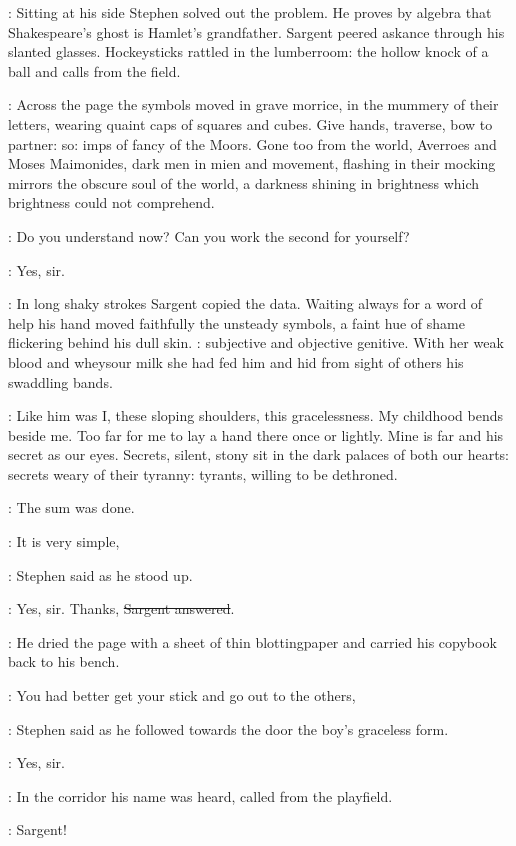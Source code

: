 :
Sitting at his side Stephen solved out the problem.
He proves by algebra that Shakespeare's ghost is Hamlet's grandfather.
Sargent peered askance through his slanted glasses.
Hockeysticks rattled in the lumberroom:
the hollow knock of a ball and calls from the field.

\StephenInt:
Across the page the symbols moved in grave morrice,
in the mummery of their letters,
wearing quaint caps of squares and cubes.
Give hands, traverse, bow to partner:
so:
imps of fancy of the Moors.
Gone too from the world,
Averroes and Moses Maimonides,
dark men in mien and movement,
flashing in their mocking mirrors the obscure soul of the world,
a darkness shining in brightness which brightness could not comprehend.

\Stephen:
Do you understand now?
Can you work the second for yourself?

\sargent:
Yes, sir.

:
In long shaky strokes Sargent copied the data.
Waiting always for a word of help
his hand moved faithfully the unsteady symbols,
a faint hue of shame flickering behind his dull skin.
: subjective and objective genitive.
With her weak blood and wheysour milk
she had fed him and hid from sight of others his swaddling bands.

\StephenInt:
Like him was I, these sloping shoulders, this gracelessness.
My childhood bends beside me.
Too far for me to lay a hand there once or lightly.
Mine is far and his secret as our eyes.
Secrets, silent, stony sit in the dark palaces of both our hearts:
secrets weary of their tyranny:
tyrants, willing to be dethroned.

:
The sum was done.

\Stephen:
It is very simple,

:
Stephen said as he stood up.

\sargent:
Yes, sir.
Thanks, \sout{Sargent answered}.

:
He dried the page with a sheet of thin blottingpaper
and carried his copybook back to his bench.

\Stephen:
You had better get your stick and go out to the others,

:
Stephen said as he followed towards the door the boy's graceless form.

\sargent:
Yes, sir.

:
In the corridor his name was heard, called from the playfield.

\deasy:
Sargent!

